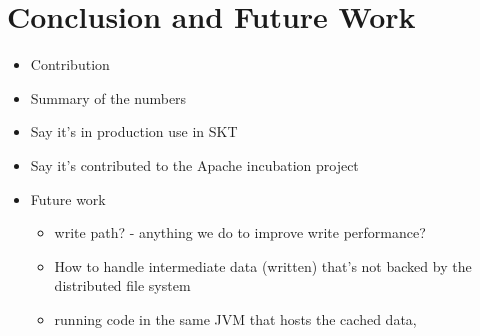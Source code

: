 \documentclass[twocolumn,10pt]{article}
\begin{document}
\section{Conclusion and Future Work}

\begin{itemize}
\item Contribution
\item Summary of the numbers
\item Say it's in production use in SKT
\item Say it's contributed to the Apache incubation project
\item Future work
\begin{itemize}
\item write path? - anything we do to improve write performance?
\item How to handle intermediate data (written) that's not backed by the distributed file system
\item running code in the same JVM that hosts the cached data,
\end{itemize}

\end{itemize}



\end{document}
